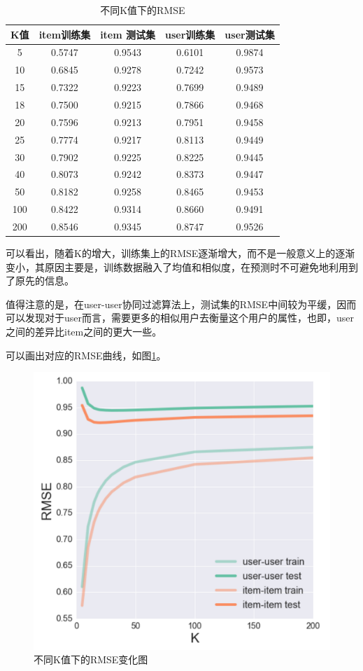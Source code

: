 \documentclass[utf8, a4paper,12pt, onecolumn]{ctexart}
\begin{document}
\begin{spacing}{1.3}
\begin{table}
	\caption{不同K值下的RMSE}
	\label{k-table}
	\centering
	\begin{tabular}{| c | c | c | c | c |}
		\hline
		\textbf{K值} & item训练集 & item 测试集&user训练集 & user测试集 \\ 
		\hline
		5 & 0.5747 	& 0.9543 & 0.6101 &	0.9874 \\ 
		\hline
		10 & 0.6845 &	0.9278 & 0.7242 &	0.9573 \\
		\hline
		15 & 0.7322 &	0.9223 & 0.7699 &	0.9489 \\
		\hline
		18 & 0.7500 &	0.9215 &	0.7866 &	0.9468 \\
		\hline
		20 & 0.7596 &	0.9213 & 0.7951 &	0.9458 \\
		\hline
		25 & 0.7774 &	0.9217 &	0.8113 &	0.9449 \\ 
		\hline
		30 & 0.7902 &	0.9225 &	0.8225 &	0.9445 \\
		\hline
		40 &0.8073 &	0.9242 &	0.8373 &	0.9447 \\
		\hline
		50 & 0.8182 &	0.9258 &	0.8465 &	0.9453 \\
		\hline
		100 & 0.8422 & 0.9314 &	0.8660 &	0.9491 \\
		\hline
		200 & 0.8546 &	0.9345 &	0.8747 &	0.9526 \\
		\hline 
	\end{tabular}
\end{table}

可以看出，随着K的增大，训练集上的RMSE逐渐增大，而不是一般意义上的逐渐变小，其原因主要是，训练数据融入了均值和相似度，在预测时不可避免地利用到了原先的信息。

值得注意的是，在user-user协同过滤算法上，测试集的RMSE中间较为平缓，因而可以发现对于user而言，需要更多的相似用户去衡量这个用户的属性，也即，user之间的差异比item之间的更大一些。

可以画出对应的RMSE曲线，如图\ref{k-figure}。

\begin{figure}
	\centering
	\caption{不同K值下的RMSE变化图}
	\label{k-figure}
	\includegraphics[width=0.95\linewidth]{k-figure.png}
\end{figure}


\end{spacing}
\end{document}

